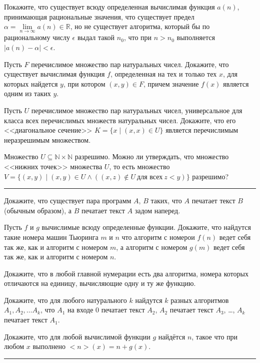 \z Покажите, что существует всюду определенная вычислимая функция $a(n)$, принимающая рациональные
значения, что существует предел $\alpha = \lim\limits_{n \to \infty} a(n) \in \mathbb{R}$, но не
существует алгоритма, который бы по рациональному числу $\epsilon$ выдал такой $n_0$, что при $n > n_0$
выполняется $|a(n) - \alpha| < \epsilon$.

\z Пусть $F$ перечислимое множество пар натуральных чисел. Докажите, что существует вычислимая функция
$f$, определенная на тех и только тех $x$, для которых найдется $y$, при котором $(x, y) \in F$, причем
значение $f(x)$ является одним из таких $y$.

\z Пусть $U$ перечислимое множество пар натуральных чисел, универсальное для класса всех перечислимых
множеств натуральных чисел. Докажите, что его <<диагональное сечение>> $K = \{x \mid (x, x) \in U\}$
является перечислимым неразрешимым множеством.

\z Множество $U \subseteq \mathbb{N} \times \mathbb{N}$ разрешимо. Можно ли утверждать, что множество
<<нижних точек>> множества $U$, то есть множество $V = \{ (x, y) \mid (x, y) \in U \land ((x, z) \notin
U~\text{для всех}~z < y )\}$ разрешимо?


\hrule

\z Докажите, что существует пара программ $A$, $B$ таких, что $A$ печатает текст $B$ (обычным образом), а
$B$ печатает текст $A$ задом наперед.

\z Пусть $f$ и $g$  вычислимые всюду определенные функции. Докажите, что найдутся такие номера машин
Тьюринга $m$ и  $n$ что алгоритм с номерои $f(n)$ ведет себя так же, как и алгоритм с номером $m$, а
алгоритм с номером $g(m)$ ведет себя так же, как и алгоритм с номером $n$.

\z Докажите, что в любой главной нумерации есть два алгоритма, номера которых отличаются на единицу,
вычисляющие одну и ту же функцию.

\z Докажите, что для любого натурального $k$ найдутся $k$ разных алгоритмов $A_1, A_2, \dots A_k$, что
$A_1$ на входе $0$ печатает текст $A_2$, $A_2$ печатает текст $A_3$, \dots, $A_k$ печатает текст $A_1$.

\z Докажите, что для любой вычислимой функции $g$ найдётся $n$, такое что при любом $x$ выполнено
${<}n{>}(x) = n + g(x)$.


\hrule

